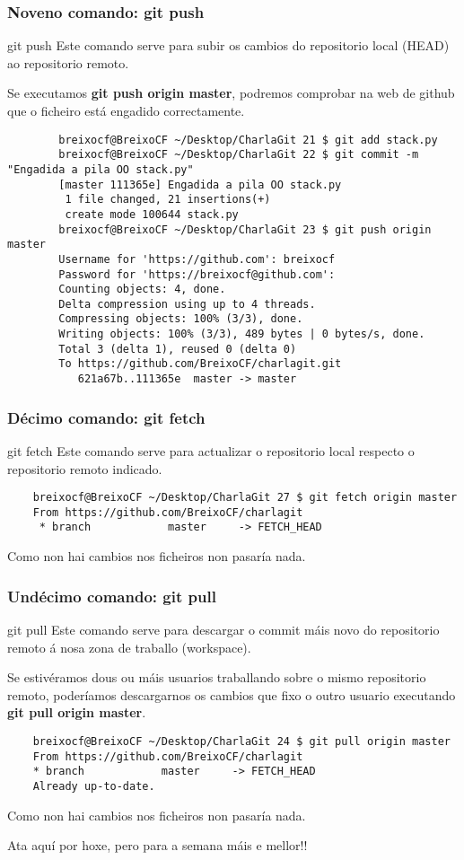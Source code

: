 \begin{frame}[fragile]
  \frametitle{Noveno comando: git push}
  \begin{block}{git push}
    Este comando serve para subir os cambios do repositorio local (HEAD) ao repositorio remoto.
  \end{block}
  \scriptsize
  Se executamos \textbf{git push origin master}, podremos comprobar na web de github que o ficheiro está engadido correctamente.
  \tiny 
	\begin{verbatim}
		breixocf@BreixoCF ~/Desktop/CharlaGit 21 $ git add stack.py 
		breixocf@BreixoCF ~/Desktop/CharlaGit 22 $ git commit -m "Engadida a pila OO stack.py"
		[master 111365e] Engadida a pila OO stack.py
		 1 file changed, 21 insertions(+)
		 create mode 100644 stack.py
		breixocf@BreixoCF ~/Desktop/CharlaGit 23 $ git push origin master 
		Username for 'https://github.com': breixocf
		Password for 'https://breixocf@github.com': 
		Counting objects: 4, done.
		Delta compression using up to 4 threads.
		Compressing objects: 100% (3/3), done.
		Writing objects: 100% (3/3), 489 bytes | 0 bytes/s, done.
		Total 3 (delta 1), reused 0 (delta 0)
		To https://github.com/BreixoCF/charlagit.git
		   621a67b..111365e  master -> master
	\end{verbatim}
\end{frame}

\begin{frame}[fragile]
  \frametitle{Décimo comando: git fetch}
  \begin{block}{git fetch}
    Este comando serve para actualizar o repositorio local respecto o repositorio remoto indicado.
  \end{block}
  \tiny
\begin{verbatim}
	breixocf@BreixoCF ~/Desktop/CharlaGit 27 $ git fetch origin master
	From https://github.com/BreixoCF/charlagit
	 * branch            master     -> FETCH_HEAD
\end{verbatim}
	\normalsize
  Como non hai cambios nos ficheiros non pasaría nada.
\end{frame}


\begin{frame}[fragile]
  \frametitle{Undécimo comando: git pull}
  \begin{block}{git pull}
    Este comando serve para descargar o commit máis novo do repositorio remoto á nosa zona de traballo (workspace).
  \end{block}
  \scriptsize
  Se estivéramos dous ou máis usuarios traballando sobre o mismo repositorio remoto, poderíamos descargarnos os cambios que fixo o outro usuario executando \textbf{git pull origin master}.
  \tiny 
	\begin{verbatim}
	breixocf@BreixoCF ~/Desktop/CharlaGit 24 $ git pull origin master 
	From https://github.com/BreixoCF/charlagit
 	* branch            master     -> FETCH_HEAD
	Already up-to-date.
	\end{verbatim}
	\normalsize
  Como non hai cambios nos ficheiros non pasaría nada.
\end{frame}

\begin{frame}
\Huge
	\begin{center}
	Ata aquí por hoxe, pero para a semana máis e mellor!!
	\end{center}
\end{frame}

